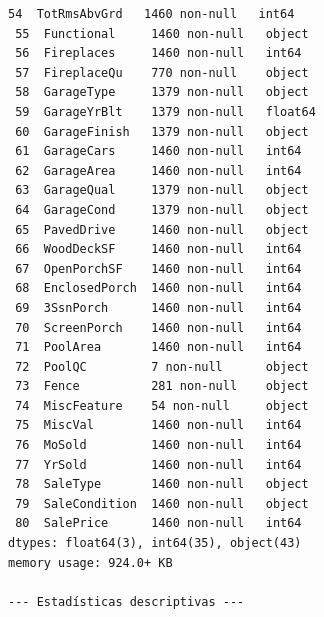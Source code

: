 \documentclass[11pt]{article}
\begin{document}
\begin{Verbatim}[commandchars=\\\{\}]
 54  TotRmsAbvGrd   1460 non-null   int64
 55  Functional     1460 non-null   object
 56  Fireplaces     1460 non-null   int64
 57  FireplaceQu    770 non-null    object
 58  GarageType     1379 non-null   object
 59  GarageYrBlt    1379 non-null   float64
 60  GarageFinish   1379 non-null   object
 61  GarageCars     1460 non-null   int64
 62  GarageArea     1460 non-null   int64
 63  GarageQual     1379 non-null   object
 64  GarageCond     1379 non-null   object
 65  PavedDrive     1460 non-null   object
 66  WoodDeckSF     1460 non-null   int64
 67  OpenPorchSF    1460 non-null   int64
 68  EnclosedPorch  1460 non-null   int64
 69  3SsnPorch      1460 non-null   int64
 70  ScreenPorch    1460 non-null   int64
 71  PoolArea       1460 non-null   int64
 72  PoolQC         7 non-null      object
 73  Fence          281 non-null    object
 74  MiscFeature    54 non-null     object
 75  MiscVal        1460 non-null   int64
 76  MoSold         1460 non-null   int64
 77  YrSold         1460 non-null   int64
 78  SaleType       1460 non-null   object
 79  SaleCondition  1460 non-null   object
 80  SalePrice      1460 non-null   int64
dtypes: float64(3), int64(35), object(43)
memory usage: 924.0+ KB

--- Estadísticas descriptivas ---
    \end{Verbatim}
\end{document}

